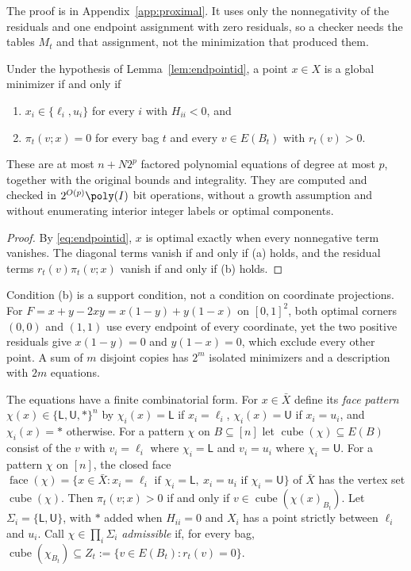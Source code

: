 The proof is in Appendix~\ref{app:proximal}. It uses only the nonnegativity
of the residuals and one endpoint assignment with zero residuals, so a
checker needs the tables $M_t$ and that assignment, not the minimization that
produced them.

\begin{theorem}\label{thm:endpointset}
Under the hypothesis of Lemma~\ref{lem:endpointid}, a point $x\in X$ is a
global minimizer if and only if
\begin{enumerate}
\item[(a)] $x_i\in\{\ell_i,u_i\}$ for every $i$ with $H_{ii}<0$, and
\item[(b)] $\pi_t(v;x)=0$ for every bag $t$ and every $v\in E(B_t)$ with
$r_t(v)>0$.
\end{enumerate}
These are at most $n+N2^p$ factored polynomial equations of degree at most
$p$, together with the original bounds and integrality. They are computed and
checked in $2^{O(p)}\poly(I)$ bit operations, without a growth assumption and
without enumerating interior integer labels or optimal components.
\end{theorem}

\begin{proof}
By \eqref{eq:endpointid}, $x$ is optimal exactly when every nonnegative term
vanishes. The diagonal terms vanish if and only if (a) holds, and the
residual terms $r_t(v)\pi_t(v;x)$ vanish if and only if (b) holds.
\end{proof}

Condition (b) is a support condition, not a condition on coordinate
projections. For $F=x+y-2xy=x(1-y)+y(1-x)$ on $[0,1]^2$, both optimal
corners $(0,0)$ and $(1,1)$ use every endpoint of every coordinate, yet the
two positive residuals give $x(1-y)=0$ and $y(1-x)=0$, which exclude every
other point. A sum of $m$ disjoint copies has $2^m$ isolated minimizers and
a description with $2m$ equations.

The equations have a finite combinatorial form. For $x\in\bar X$ define its
\emph{face pattern} $\chi(x)\in\{\mathsf L,\mathsf U,\ast\}^n$ by
$\chi_i(x)=\mathsf L$ if $x_i=\ell_i$, $\chi_i(x)=\mathsf U$ if $x_i=u_i$, and
$\chi_i(x)=\ast$ otherwise. For a pattern $\chi$ on $B\subseteq[n]$ let
$\operatorname{cube}(\chi)\subseteq E(B)$ consist of the $v$ with $v_i=\ell_i$
where $\chi_i=\mathsf L$ and $v_i=u_i$ where $\chi_i=\mathsf U$. For a
pattern $\chi$ on $[n]$, the closed face
$\operatorname{face}(\chi)=\{x\in\bar X:x_i=\ell_i\text{ if }\chi_i=\mathsf L,\
x_i=u_i\text{ if }\chi_i=\mathsf U\}$ of $\bar X$ has the vertex set
$\operatorname{cube}(\chi)$. Then $\pi_t(v;x)>0$ if and only if
$v\in\operatorname{cube}(\chi(x)_{B_t})$. Let $\Sigma_i=\{\mathsf L,\mathsf U\}$,
with $\ast$ added when $H_{ii}=0$ and $X_i$ has a point strictly between
$\ell_i$ and $u_i$. Call $\chi\in\prod_i\Sigma_i$ \emph{admissible} if, for
every bag, $\operatorname{cube}(\chi_{B_t})\subseteq Z_t:=\{v\in E(B_t):r_t(v)=0\}$.

